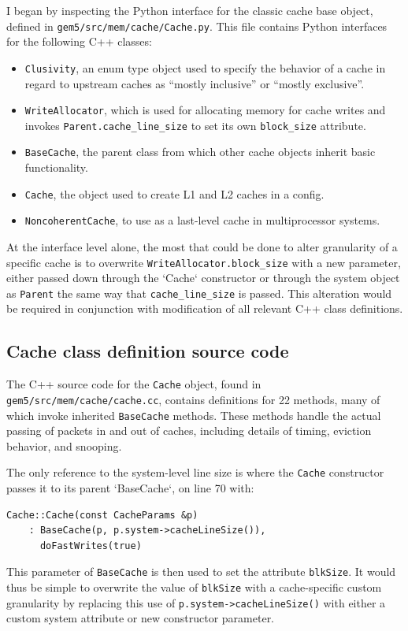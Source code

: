\documentclass[12pt,twoside]{reedthesis}
\begin{document}
	I began by inspecting the Python interface for the classic cache base object, defined in \verb`gem5/src/mem/cache/Cache.py`. This file contains Python interfaces for the following C++ classes:
	\begin{itemize}
		\item \verb`Clusivity`, an enum type object used to specify the behavior of a cache in regard to upstream caches as ``mostly inclusive'' or ``mostly exclusive''.
		\item \verb`WriteAllocator`, which is used for allocating memory for cache writes and invokes \verb`Parent.cache_line_size` to set its own \verb`block_size` attribute.
		\item \verb`BaseCache`, the parent class from which other cache objects inherit basic functionality.
		\item \verb`Cache`, the object used to create L1 and L2 caches in a config.
		\item \verb`NoncoherentCache`, to use as a last-level cache in multiprocessor systems.
	\end{itemize}

	At the interface level alone, the most that could be done to alter granularity of a specific cache is to overwrite \verb`WriteAllocator.block_size` with a new parameter, either passed down through the `Cache` constructor or through the system object as \verb`Parent` the same way that \verb`cache_line_size` is passed. This alteration would be required in conjunction with modification of all relevant C++ class definitions.

	\subsection*{Cache class definition source code}

	The C++ source code for the \verb`Cache` object, found in \verb`gem5/src/mem/cache/cache.cc`, contains definitions for 22 methods, many of which invoke inherited \verb`BaseCache` methods. These methods handle the actual passing of packets in and out of caches, including details of timing, eviction behavior, and snooping.

	The only reference to the system-level line size is where the \verb`Cache` constructor passes it to its parent `BaseCache`, on line 70 with:
	\begin{verbatim}
Cache::Cache(const CacheParams &p)
    : BaseCache(p, p.system->cacheLineSize()),
      doFastWrites(true)
	\end{verbatim}
	This parameter of \verb`BaseCache` is then used to set the attribute \verb`blkSize`. It would thus be simple to overwrite the value of \verb`blkSize` with a cache-specific custom granularity by replacing this use of \verb`p.system->cacheLineSize()` with either a custom system attribute or new constructor parameter.
\end{document}
